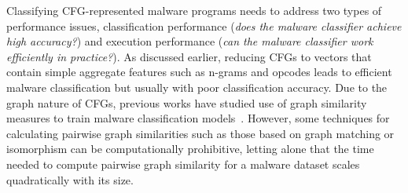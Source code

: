Classifying CFG-represented malware programs needs to address two types of performance issues,
classification performance ({\it does the malware classifier achieve high accuracy?}) and execution performance ({\it can the malware classifier work efficiently in practice?}).
As discussed earlier, reducing CFGs to vectors that contain simple aggregate features such as n-grams and opcodes leads to efficient malware classification but usually with poor classification accuracy.
Due to the graph nature of CFGs, previous works have studied use of graph similarity measures to train malware classification models~\cite{hu2009large,cesare2010classification,kong2013discriminant}.
However, some techniques for calculating pairwise graph similarities such as those based on graph matching or isomorphism can be computationally prohibitive,
letting alone that the time needed to compute pairwise graph similarity for a malware dataset scales quadratically with its size.



